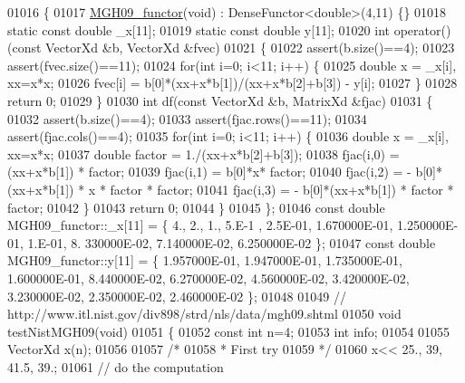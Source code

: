 \begin{DoxyCode}
01016 \{
01017     \hyperlink{struct_m_g_h09__functor}{MGH09\_functor}(\textcolor{keywordtype}{void}) : DenseFunctor<double>(4,11) \{\}
01018     \textcolor{keyword}{static} \textcolor{keyword}{const} \textcolor{keywordtype}{double} \_x[11];
01019     \textcolor{keyword}{static} \textcolor{keyword}{const} \textcolor{keywordtype}{double} y[11];
01020     \textcolor{keywordtype}{int} operator()(\textcolor{keyword}{const} VectorXd &b, VectorXd &fvec)
01021     \{
01022         assert(b.size()==4);
01023         assert(fvec.size()==11);
01024         \textcolor{keywordflow}{for}(\textcolor{keywordtype}{int} i=0; i<11; i++) \{
01025             \textcolor{keywordtype}{double} x = \_x[i], xx=x*x;
01026             fvec[i] = b[0]*(xx+x*b[1])/(xx+x*b[2]+b[3]) - y[i];
01027         \}
01028         \textcolor{keywordflow}{return} 0;
01029     \}
01030     \textcolor{keywordtype}{int} df(\textcolor{keyword}{const} VectorXd &b, MatrixXd &fjac)
01031     \{
01032         assert(b.size()==4);
01033         assert(fjac.rows()==11);
01034         assert(fjac.cols()==4);
01035         \textcolor{keywordflow}{for}(\textcolor{keywordtype}{int} i=0; i<11; i++) \{
01036             \textcolor{keywordtype}{double} x = \_x[i], xx=x*x;
01037             \textcolor{keywordtype}{double} factor = 1./(xx+x*b[2]+b[3]);
01038             fjac(i,0) = (xx+x*b[1]) * factor;
01039             fjac(i,1) = b[0]*x* factor;
01040             fjac(i,2) = - b[0]*(xx+x*b[1]) * x * factor * factor;
01041             fjac(i,3) = - b[0]*(xx+x*b[1]) * factor * factor;
01042         \}
01043         \textcolor{keywordflow}{return} 0;
01044     \}
01045 \};
01046 \textcolor{keyword}{const} \textcolor{keywordtype}{double} MGH09\_functor::\_x[11] = \{ 4., 2., 1., 5.E-1 , 2.5E-01, 1.670000E-01, 1.250000E-01,  1.E-01, 8.
      330000E-02, 7.140000E-02, 6.250000E-02 \};
01047 \textcolor{keyword}{const} \textcolor{keywordtype}{double} MGH09\_functor::y[11] = \{ 1.957000E-01, 1.947000E-01, 1.735000E-01, 1.600000E-01, 8.440000E-02,
       6.270000E-02, 4.560000E-02, 3.420000E-02, 3.230000E-02, 2.350000E-02, 2.460000E-02 \};
01048 
01049 \textcolor{comment}{// http://www.itl.nist.gov/div898/strd/nls/data/mgh09.shtml}
01050 \textcolor{keywordtype}{void} testNistMGH09(\textcolor{keywordtype}{void})
01051 \{
01052   \textcolor{keyword}{const} \textcolor{keywordtype}{int} n=4;
01053   \textcolor{keywordtype}{int} info;
01054 
01055   VectorXd x(n);
01056 
01057   \textcolor{comment}{/*}
01058 \textcolor{comment}{   * First try}
01059 \textcolor{comment}{   */}
01060   x<< 25., 39, 41.5, 39.;
01061   \textcolor{comment}{// do the computation}

\end{DoxyCode}
